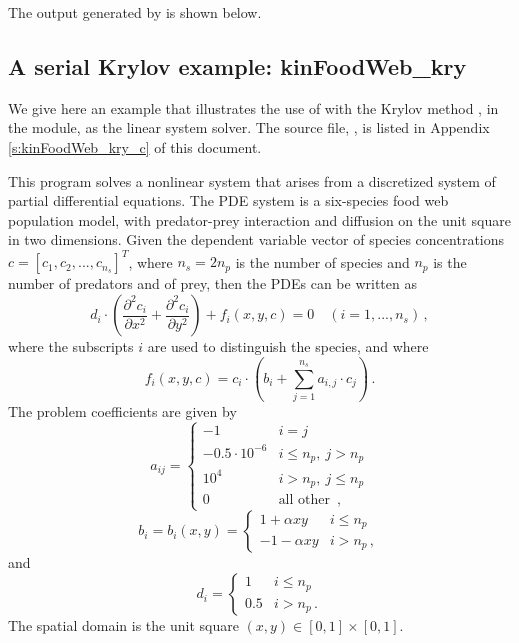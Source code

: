 The output generated by  is shown below.




\subsection{A serial Krylov example: kinFoodWeb\_kry}\label{ss:kinFoodWeb_kry}

We give here an example that illustrates the use of {\kinsol} with the Krylov
method {\spgmr}, in the {\kinspgmr} module, as the linear system solver.
The source file, , is listed in Appendix
\ref{s:kinFoodWeb_kry_c} of this document.

This program solves a nonlinear system that arises from a discretized system of partial
differential equations. The PDE system is a six-species food web population
model, with predator-prey interaction and diffusion on the unit square in
two dimensions. Given the dependent variable vector of species concentrations
$c = [c_1, c_2,..., c_{n_s}]^T$, where $n_s = 2 n_p$ is the number of species 
and $n_p$ is the number of predators and of prey, then
the PDEs can be written as
\begin{equation}\label{e:kinFoodWeb_kry_pde}
  d_i \cdot \left( \frac{\partial^2 c_i}{\partial x^2} + 
    \frac{\partial^2 c_i}{\partial y^2} \right) + f_i(x,y,c) = 0
  \quad (i=1,...,n_s) \, ,
\end{equation}
where the subscripts $i$ are used to distinguish the species, and where
\begin{equation}\label{e:kinFoodWeb_kry_fterm}
f_i(x,y,c) = c_i \cdot \left(b_i + \sum_{j=1}^{n_s} a_{i,j} \cdot c_j \right) \, .
\end{equation}
The problem coefficients are given by
\begin{equation*}
  a_{ij} = 
  \begin{cases}
    -1                 & i=j \\
    -0.5 \cdot 10^{-6} & i \leq n_p , ~ j > n_p  \\
    10^4               & i > n_p , ~ j \leq n_p  \\
    0                  & \mbox{all other } \, ,
  \end{cases}
\end{equation*}
\begin{equation*}
  b_i = b_i(x,y) = 
  \begin{cases}
    1 + \alpha xy   & i \leq n_p  \\
    -1 - \alpha xy   & i > n_p \, ,
  \end{cases}
\end{equation*}
and
\begin{equation*}
  d_i = 
  \begin{cases}
    1 & i \leq n_p  \\
    0.5 & i > n_p  \, .
  \end{cases}
\end{equation*}
The spatial domain is the unit square $(x,y) \in [0,1] \times [0,1]$.

